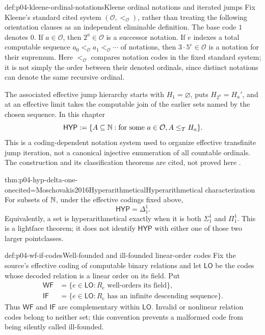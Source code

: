 \begin{hbmethod}{def:p04-kleene-ordinal-notations}{Kleene ordinal notations and iterated jumps}
Fix Kleene's standard cited system \((\mathcal O,<_{\mathcal O})\), rather
than treating the following orientation clauses as an independent eliminable
definition.  The base code \(1\) denotes \(0\).  If \(a\in\mathcal O\), then
\(2^a\in\mathcal O\) is a successor notation.  If \(e\) indexes a total
computable sequence \(a_0<_{\mathcal O}a_1<_{\mathcal O}\cdots\) of notations,
then \(3\cdot5^e\in\mathcal O\) is a notation for their supremum.
Here \(<_{\mathcal O}\) compares notation codes in the fixed standard system;
it is not simply the order between their denoted ordinals, since distinct
notations can denote the same recursive ordinal.

The associated effective jump hierarchy starts with \(H_1=\varnothing\),
puts \(H_{2^a}=H_a'\), and at an effective limit takes the computable join of
the earlier sets named by the chosen sequence.  In this chapter
\[
 \mathsf{HYP}\mathrel{:=}
 \{A\subseteq\mathbb{N}:\text{for some }a\in\mathcal O, A\leq_T H_a\}.
\]
This is a coding-dependent notation system used to organize effective
transfinite jump iteration, not a canonical injective enumeration of all
countable ordinals.  The construction and its classification theorems are
cited, not proved here \cite{Kleene1955Hierarchy,
Moschovakis2016Hyperarithmetical,Rogers1967}.
\end{hbmethod}

\begin{hbtheorem}{thm:p04-hyp-delta-one-one}{cited=Moschovakis2016Hyperarithmetical}{Hyperarithmetical characterization}
For subsets of \(\mathbb{N}\), under the effective codings fixed above,
\[
 \mathsf{HYP}=\Delta^1_1.
\]
Equivalently, a set is hyperarithmetical exactly when it is both
\(\Sigma^1_1\) and \(\Pi^1_1\).  This is a lightface theorem; it does not
identify \(\mathsf{HYP}\) with either one of those two larger pointclasses.
\end{hbtheorem}

\begin{hbdefinition}{def:p04-wf-if-codes}{Well-founded and ill-founded linear-order codes}
Fix the source's effective coding of computable binary relations and let
\(\mathsf{LO}\) be the codes whose decoded relation is a linear order on its
field.  Put
\[
 \begin{aligned}
  \mathsf{WF}&=\{e\in\mathsf{LO}:R_e
       \text{ well-orders its field}\},\\
  \mathsf{IF}&=\{e\in\mathsf{LO}:R_e
       \text{ has an infinite descending sequence}\}.
 \end{aligned}
\]
Thus \(\mathsf{WF}\) and \(\mathsf{IF}\) are complementary within
\(\mathsf{LO}\).  Invalid or nonlinear relation codes belong to neither set;
this convention prevents a malformed code from being silently called
ill-founded.
\end{hbdefinition}

